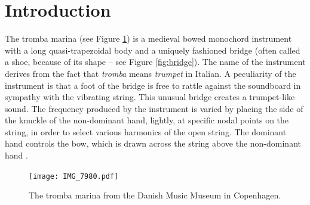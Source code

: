\documentclass[dvipsnames, pdftex]{article}
\title{\papertitle}
\def\SBcomment[#1]{\textcolor{Red}{#1}}
\def\MDcomment[#1]{\textcolor{Blue}{#1}}
\def\SScomment[#1]{\textcolor{OliveGreen}{#1}}
\begin{document}
%
\capstartfalse
\maketitle
\capstarttrue
%
\begin{abstract}
The tromba marina is a medieval bowed monochord instrument. The string of the instrument rests on a rattling bridge that, due to the collision with the body, creates a trumpet-like sound. This paper presents a real-time implementation of a physical model of the tromba marina. The goal of the simulation is to make the instrument accessible to a larger audience. The physical model is implemented using finite-difference time-domain (FDTD) methods and non-iterative collision methods. A real-time implementation of the instrument is also presented. The simulation exhibits brass-like qualities and sounds similar to a real tromba marina, but requires further testing to validate the realism.
\end{abstract}
%

\section{Introduction}\label{sec:introduction}
The tromba marina (see Figure 
 \ref{fig:tromba}) is a medieval bowed monochord instrument with a long quasi-trapezoidal body and a uniquely fashioned bridge (often called a shoe, because of its shape – see Figure \ref{fig:bridge}). 
 The name of the instrument derives from the fact that {\em tromba} means {\em trumpet} in Italian. A peculiarity of the instrument is that 
 a foot of the bridge is free to rattle against the soundboard in sympathy with the vibrating string. 
 This unusual bridge creates a trumpet-like sound.
 The frequency produced by the instrument is varied by placing the side of the knuckle of the non-dominant hand, lightly, at specific nodal points on the string, in order to select various harmonics of the open string. The dominant hand controls the bow, which is drawn across the string above the non-dominant hand \cite{munrow1976instruments}.
 
  
   \begin{figure}
  \centering
  \texttt{[image: IMG\_7980.pdf]}
  \caption{The tromba marina from the Danish Music Museum in Copenhagen. }
  \label{fig:tromba}
\end{figure}
\end{document}
